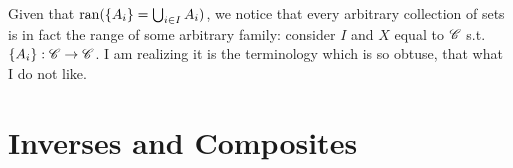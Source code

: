 \documentclass{report}
\begin{document}
Given that \( \operatorname{ran} (\{A_i\}= \bigcup_{i \in  I} A_i  ) \), we notice that every arbitrary collection of sets is in fact the range of some arbitrary family: consider \( I \) and \( X \) equal to \( {\mathscr{C}} \) s.t. \( \{A_i\} : {\mathscr{C}} \to  {\mathscr{C}}  \). I am realizing it is the terminology which is so obtuse, that what I do not like. 


\section{Inverses and Composites}
\end{document}
